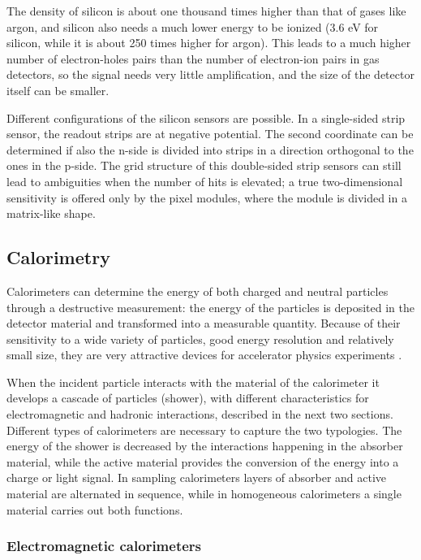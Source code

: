 The density of silicon is about one thousand times higher than that of gases like argon, and silicon also needs a much lower energy to be ionized (3.6 eV for silicon, while it is about 250 times higher for argon). This leads to a much higher number of electron-holes pairs than the number of electron-ion pairs in gas detectors, so the signal needs very little amplification, and the size of the detector itself can be smaller. 

Different configurations of the silicon sensors are possible. In a single-sided strip sensor, the readout strips are at negative potential. The second coordinate can be determined if also the n-side is divided into strips in a direction orthogonal to the ones in the p-side. 
The grid structure of this double-sided strip sensors can still lead to ambiguities when the number of hits is elevated; a true two-dimensional sensitivity is offered only by the pixel modules, where the module is divided in a matrix-like shape.



\subsection{Calorimetry}
\label{sec:dec:calo}

Calorimeters can determine the energy of both charged and neutral particles through a destructive measurement: the energy of the particles is deposited in the detector material and transformed into a measurable quantity. Because of their sensitivity to a wide variety of particles, good energy resolution and relatively small size, they are very attractive devices for accelerator physics experiments \cite{RevModPhys.75.1243,Wigmans:2000vf}.

When the incident particle interacts with the material of the calorimeter it develops a cascade of particles (shower), with different characteristics for electromagnetic and hadronic interactions, described in the next two sections. Different types of calorimeters are necessary to capture the two typologies. The energy of the shower is decreased by the interactions happening in the absorber material, while the active material provides the conversion of the energy into a charge or light signal. In sampling calorimeters layers of absorber and active material are alternated in sequence, while in homogeneous calorimeters a single material carries out both functions.


\subsubsection*{Electromagnetic calorimeters}

